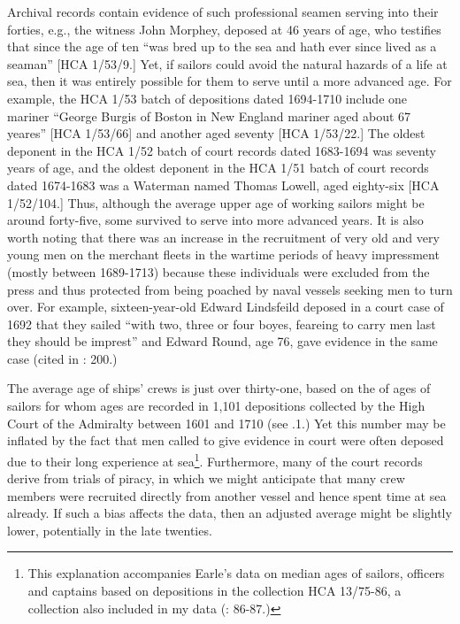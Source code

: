 Archival records contain evidence of such professional seamen serving into their forties, e.g., the witness John Morphey, deposed at 46 years of age, who testifies that since the age of ten “was bred up to the sea and hath ever since lived as a seaman” [HCA 1/53/9.] Yet, if sailors could avoid the natural hazards of a life at sea, then it was entirely possible for them to serve until a more advanced age. For example, the HCA 1/53 batch of depositions dated 1694-1710 include one mariner “George Burgis of Boston in New England mariner aged about 67 yeares” [HCA 1/53/66] and another aged seventy [HCA 1/53/22.] The oldest deponent in the HCA 1/52 batch of court records dated 1683-1694 was seventy years of age, and the oldest deponent in the HCA 1/51 batch of court records dated 1674-1683 was a Waterman named Thomas Lowell, aged eighty-six [HCA 1/52/104.] Thus, although the average upper age of working sailors might be around forty-five, some survived to serve into more advanced years. It is also worth noting that there was an increase in the recruitment of very old and very young men on the merchant fleets in the wartime periods of heavy impressment (mostly between 1689-1713) because these individuals were excluded from the press and thus protected from being poached by naval vessels seeking men to turn over. For example, sixteen-year-old Edward Lindsfeild deposed in a court case of 1692 that they sailed “with two, three or four boyes, feareing to carry men last they should be imprest” and Edward Round, age 76, gave evidence in the same case (cited in \citealt{Earle1998}: 200.) 

 The average age of ships’ crews is just over thirty-one, based on the of ages of sailors for whom ages are recorded in 1,101 depositions collected by the High Court of the Admiralty between 1601 and 1710 (see .1.) Yet this number may be inflated by the fact that men called to give evidence in court were often deposed due to their long experience at sea\footnote{This explanation accompanies Earle’s data on median ages of sailors, officers and captains based on depositions in the collection HCA 13/75-86, a collection also included in my data (\citealt{Earle1993}: 86-87.)}. Furthermore, many of the court records derive from trials of piracy, in which we might anticipate that many crew members were recruited directly from another vessel and hence spent time at sea already. If such a bias affects the data, then an adjusted average might be slightly lower, potentially in the late twenties.

